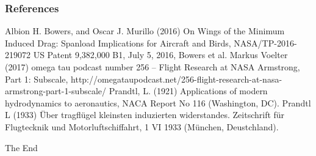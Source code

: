 \documentclass{beamer}
\begin{document}
\begin{frame}
\frametitle{References}
\footnotesize{
\begin{thebibliography}{99} %

 Albion H. Bowers, and Oscar J. Murillo (2016) On Wings of the Minimum Induced Drag:  Spanload Implications for Aircraft and Birds, NASA/TP-2016-219072
 US Patent 9,382,000 B1, July 5, 2016, Bowers et al.
 Markus Voelter (2017) omega tau podcast number 256 – Flight Research at NASA Armstrong, Part 1: Subscale, http://omegataupodcast.net/256-flight-research-at-nasa-armstrong-part-1-subscale/
 Prandtl, L.  (1921)  Applications  of  modern hydrodynamics  to  aeronautics,  NACA  Report  No  116 (Washington, DC).
 Prandtl L (1933) Über tragfl\"ugel kleinsten induzierten widerstandes. Zeitschrift für Flugtecknik und Motorluftschiffahrt, 1 VI 1933 (M\"unchen, Deustchland).



\end{thebibliography}
}
\end{frame}


\begin{frame}
\Huge{\centerline{The End}}
\end{frame}

\end{document}
